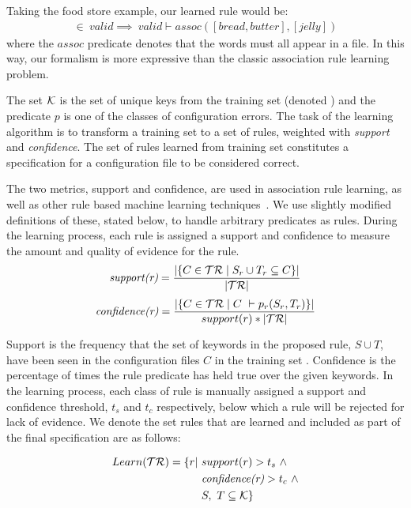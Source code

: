 Taking the food store example, our learned rule would be:
\begin{align*}
[bread, butter] \in\ valid \implies\ valid \vdash assoc([bread,butter],[jelly])
\end{align*}
%
where the $assoc$ predicate denotes that the words must all appear in a file. 
In this way, our formalism is more expressive than the classic association rule learning problem.

The set $\mathcal{K}$ is the set of unique keys from the training set (denoted \trainingSet) and the predicate $p$ is one of the classes of configuration errors.
The task of the learning algorithm is to transform a training set to a set of rules, weighted with \textit{support} and \textit{confidence}.
The set of rules learned from training set \trainingSet constitutes a specification for a configuration file to be considered correct.

The two metrics, support and confidence, are used in association rule learning, as well as other rule based machine learning techniques~\cite{han2007frequent,langley1995applications}.
We use slightly modified definitions of these, stated below, to handle arbitrary predicates as rules.
During the learning process, each rule is assigned a support and confidence to measure the amount and quality of evidence for the rule.
%
\begin{equation*}
 \textit{support(r)} = \frac{|\{C \in \mathcal{TR} \mid S_r \cup T_r \subseteq C\}|} {|\mathcal{TR}|}
\end{equation*}
\begin{equation*}
 \textit{confidence(r)} = \frac{|\{C \in \mathcal{TR} \mid C\ \vdash p_r(S_r,T_r) \}| } {support(r)*|\mathcal{TR}|}
\end{equation*}

Support is the frequency that the set of keywords in the proposed rule, $S \cup T$, have been seen in the configuration files $C$ in the training set \trainingSet.
Confidence is the percentage of times the rule predicate has held true over the given keywords.
In the learning process, each class of rule is manually assigned a support and confidence threshold, $t_s$ and $t_c$ respectively, below which a rule will be rejected for lack of evidence.
We denote the set rules that are learned and included as part of the final specification are as follows:

\begin{align}
Learn(\mathcal{TR}) = \{r | \ &support(r) > t_s\ \land \nonumber \\
    & \textit{confidence(r)} > t_c\ \land \label{eq:learn}\\ 
    & S,\ T \subseteq \mathcal{K}\} \nonumber
\end{align}

